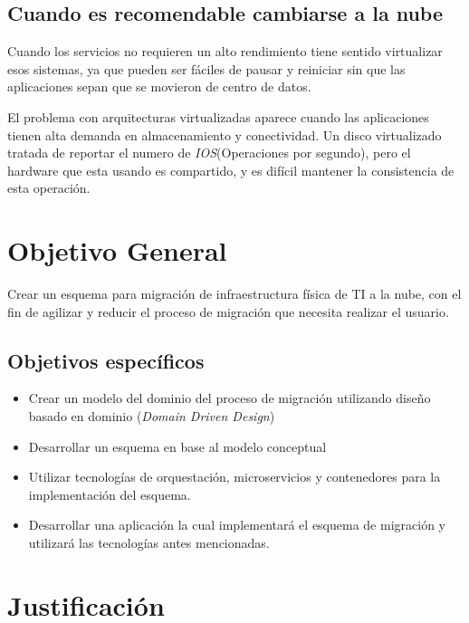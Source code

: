 \documentclass[12pt,twoside]{reedthesis}
\theoremstyle{definition}
\theoremstyle{definition}
\theoremstyle{definition}
\theoremstyle{remark}
\begin{document}
\hypertarget{cuando-es-recomendable-cambiarse-a-la-nube}{%
\subsection{Cuando es recomendable cambiarse a la
nube}\label{cuando-es-recomendable-cambiarse-a-la-nube}}

Cuando los servicios no requieren un alto rendimiento tiene sentido
virtualizar esos sistemas, ya que pueden ser fáciles de pausar y
reiniciar sin que las aplicaciones sepan que se movieron de centro de
datos.

El problema con arquitecturas virtualizadas aparece cuando las
aplicaciones tienen alta demanda en almacenamiento y conectividad. Un
disco virtualizado tratada de reportar el numero de
\emph{IOS}(Operaciones por segundo), pero el hardware que esta usando es
compartido, y es difícil mantener la consistencia de esta operación.

\hypertarget{objetivo-general}{%
\section{Objetivo General}\label{objetivo-general}}

Crear un esquema para migración de infraestructura física de TI a la
nube, con el fin de agilizar y reducir el proceso de migración que
necesita realizar el usuario.

\hypertarget{objetivos-especificos}{%
\subsection{Objetivos específicos}\label{objetivos-especificos}}
\begin{itemize}
\item
  Crear un modelo del dominio del proceso de migración utilizando diseño
  basado en dominio (\emph{Domain Driven Design})
\item
  Desarrollar un esquema en base al modelo conceptual
\item
  Utilizar tecnologías de orquestación, microservicios y contenedores
  para la implementación del esquema.
\item
  Desarrollar una aplicación la cual implementará el esquema de
  migración y utilizará las tecnologías antes mencionadas.
\end{itemize}
\hypertarget{justificacion}{%
\section{Justificación}\label{justificacion}}
\end{document}
